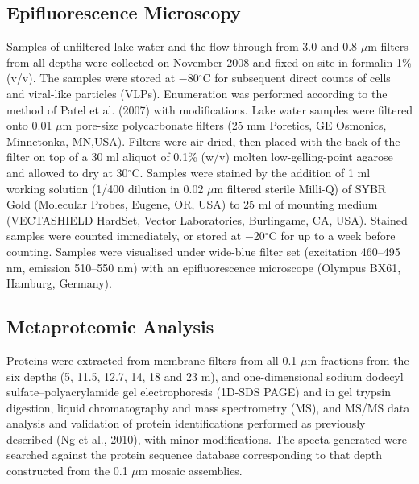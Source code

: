\subsection{Epifluorescence Microscopy}
Samples of unfiltered lake water and the flow-through from 3.0 and 0.8 $\mu$m filters from all depths were collected on November 2008 and fixed on site in formalin 1\% (v/v). 
The samples were stored at $-$80$^{\circ}$C for subsequent direct counts of cells and viral-like particles (VLPs). 
Enumeration was performed according to the method of Patel et al. (2007) with modifications. 
Lake water samples were filtered onto 0.01 $\mu$m pore-size polycarbonate filters (25 mm Poretics, GE Osmonics, Minnetonka, MN,USA). 
Filters were air dried, then placed with the back of the filter on top of a 30 ml aliquot of 0.1\% (w/v) molten low-gelling-point agarose and allowed to dry at 30$^{\circ}$C. 
Samples were stained by the addition of 1 ml working solution (1/400 dilution in 0.02 $\mu$m filtered sterile Milli-Q) of SYBR Gold (Molecular Probes, Eugene, OR, USA) to 25 ml of mounting medium (VECTASHIELD HardSet, Vector Laboratories, Burlingame, CA, USA). 
Stained samples were counted immediately, or stored at $-$20$^{\circ}$C for up to a week before counting. 
Samples were visualised under wide-blue filter set (excitation 460--495 nm, emission 510--550 nm) with an epifluorescence microscope (Olympus BX61, Hamburg, Germany).


\subsection{Metaproteomic Analysis}
Proteins were extracted from membrane filters from all 0.1 $\mu$m fractions from the six depths (5, 11.5, 12.7, 14, 18 and 23 m), and one-dimensional sodium dodecyl sulfate–polyacrylamide gel electrophoresis (1D-SDS PAGE) and in gel trypsin digestion, liquid chromatography and mass spectrometry (MS), and MS/MS data analysis and validation of protein identifications performed as previously described (Ng et al., 2010), with minor modifications.
The specta generated were searched against the protein sequence database corresponding to that depth constructed from the 0.1 $\mu$m mosaic assemblies. 

